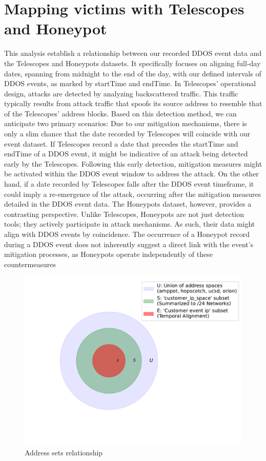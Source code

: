 \section{Mapping victims with Telescopes and Honeypot}\label{sec:mapping_victim}
This analysis establish a relationship between our recorded DDOS event data and the Telescopes and  Honeypots datasets. It specifically focuses on aligning full-day dates, spanning from midnight to the end of the day, with our defined intervals of DDOS events, as marked by startTime and endTime. 
In Telescopes' operational design, attacks are detected by analyzing backscattered traffic. This traffic typically results from attack traffic that spoofs its source address to resemble that of the Telescopes' address blocks. Based on this detection method, we can anticipate two primary scenarios:
Due to our mitigation mechanisms, there is only a slim chance that the date recorded by Telescopes will coincide with our event dataset. If Telescopes record a date that precedes the startTime and endTime of a DDOS event, it might be indicative of an attack being detected early by the Telescopes. Following this early detection, mitigation measures might be activated within the DDOS event window to address the attack. On the other hand, if a date recorded by Telescopes falls after the DDOS event timeframe, it could imply a re-emergence of the attack, occurring after the mitigation measures detailed in the DDOS event data.
The Honeypots dataset, however, provides a contrasting perspective. Unlike Telescopes, Honeypots are not just detection tools; they actively participate in attack mechanisms. As such, their data might align with DDOS events by coincidence. The occurrence of a Honeypot record during a DDOS event does not inherently suggest a direct link with the event's mitigation processes, as Honeypots operate independently of these countermeasures
\begin{figure}[htbp]
    \centering
    \includegraphics[scale=0.5]{graphs/sets.pdf}
    \caption{Address sets relationship}
    \label{fig:addresssets}
\end{figure}

